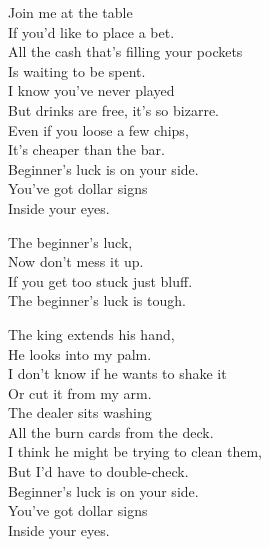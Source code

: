 
\label{album:gumboot-soup}





Join me at the table \\
If you'd like to place a bet. \\
All the cash that's filling your pockets \\
Is waiting to be spent. \\
I know you've never played \\
But drinks are free, it's so bizarre. \\
Even if you loose a few chips, \\
It's cheaper than the bar. \\

Beginner's luck is on your side. \\
You've got dollar signs \\
Inside your eyes. \\


The beginner's luck, \\
Now don't mess it up. \\
If you get too stuck just bluff. \\
The beginner's luck is tough. \\


The king extends his hand, \\
He looks into my palm. \\
I don't know if he wants to shake it \\
Or cut it from my arm. \\
The dealer sits washing \\
All the burn cards from the deck. \\
I think he might be trying to clean them, \\
But I'd have to double-check. \\

Beginner's luck is on your side. \\
You've got dollar signs \\
Inside your eyes. \\

